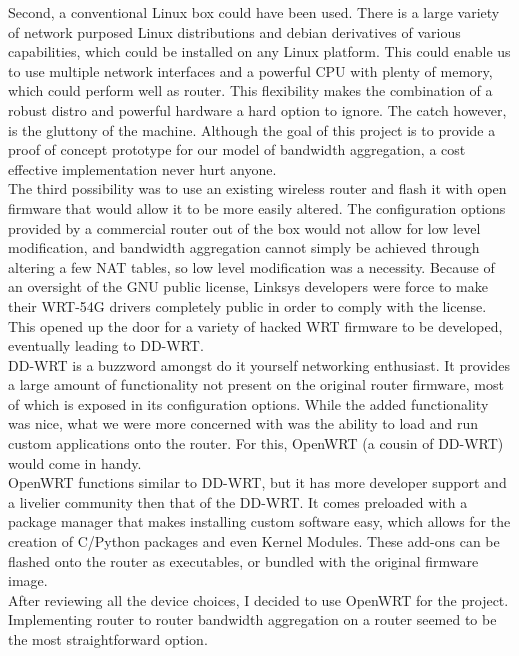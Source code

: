 \documentclass[12pt]{article}
\begin{document}
		Second, a conventional Linux box could have been used. There is a large variety of network purposed Linux distributions and debian derivatives of various capabilities, which could be installed on any Linux platform. This could enable us to use multiple network interfaces and a powerful CPU with plenty of memory, which could perform well as router. This flexibility makes the combination of a robust distro and powerful hardware a hard option to ignore. The catch however, is the gluttony of the machine. Although the goal of this project is to provide a proof of concept prototype for our model of bandwidth aggregation, a cost effective implementation never hurt anyone. \\

		The third possibility was to use an existing wireless router and flash it with open firmware that would allow it to be more easily altered. The configuration options provided by a commercial router out of the box would not allow for low level modification, and bandwidth aggregation cannot simply be achieved through altering a few NAT tables, so low level modification was a necessity. Because of an oversight of the GNU public license, Linksys developers were force to make their WRT-54G drivers completely public in order to comply with the license. This opened up the door for a variety of hacked WRT firmware to be developed, eventually leading to DD-WRT. \\

		DD-WRT is a buzzword amongst do it yourself networking enthusiast. It provides a large amount of functionality not present on the original router firmware, most of which is exposed in its configuration options. While the added functionality was nice, what we were more concerned with was the ability to load and run custom applications onto the router. For this, OpenWRT (a cousin of DD-WRT) would come in handy. \\

		OpenWRT functions similar to DD-WRT, but it has more developer support and a livelier community then that of the DD-WRT. It comes preloaded with a package manager that makes installing custom software easy, which allows for the creation of C/Python packages and even Kernel Modules. These add-ons can be flashed onto the router as executables, or bundled with the original firmware image. \\

		After reviewing all the device choices, I decided to use OpenWRT for the project. Implementing router to router bandwidth aggregation on a router seemed to be the most straightforward option. 
\end{document}
